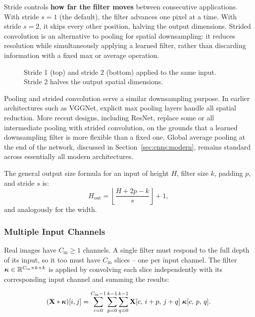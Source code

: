 Stride controls \textbf{how far the filter moves} between consecutive applications. With stride $s = 1$ (the default), the filter advances one pixel at a time. With stride $s = 2$, it skips every other position, halving the output dimensions.
Strided convolution is an alternative to pooling for spatial downsampling: it reduces resolution while simultaneously applying a learned filter, rather than discarding information with a fixed max or average operation. 

\begin{figure}[h]
    \centering
    \resizebox{0.7\textwidth}{!}{}
    \caption{Stride 1 (top) and stride 2 (bottom) applied to the same input. Stride 2 halves the output spatial dimensions.}
    \label{fig:stride}
\end{figure}
Pooling and strided convolution serve a similar downsampling purpose. In earlier architectures such as VGGNet, explicit max pooling layers handle all spatial reduction. More recent designs, including ResNet, replace some or all intermediate pooling with strided convolution, on the grounds that a learned downsampling filter is more flexible than a fixed one. Global average pooling at the end of the network, discussed in Section~\ref{sec:cnns:modern}, remains standard across essentially all modern architectures.

The general output size formula for an input of height $H$, filter size $k$, padding $p$, and stride $s$ is:
\begin{equation}
    H_{\mathrm{out}} = \left\lfloor \frac{H + 2p - k}{s} \right\rfloor + 1,
    \label{eq:output_size}
\end{equation}
and analogously for the width. 


\subsubsection{Multiple Input Channels}

Real images have $C_{\mathrm{in}} \geq 1$ channels. A single filter must respond to the full depth of its input, so it too must have $C_{\mathrm{in}}$ slices -- one per input channel. The filter $\boldsymbol{\kappa} \in \mathbb{R}^{C_{\mathrm{in}} \times k \times k}$ is applied by convolving each slice independently with its corresponding input channel and summing the results:

\begin{equation}
    (\mathbf{X} * \boldsymbol{\kappa})[i,j] = \sum_{c=0}^{C_{\mathrm{in}}-1}\sum_{p=0}^{k-1}\sum_{q=0}^{k-1}
    \mathbf{X}[c,\, i+p,\, j+q]\; \boldsymbol{\kappa}[c,\, p,\, q].
    \label{eq:conv2d_multichannel}
\end{equation}

